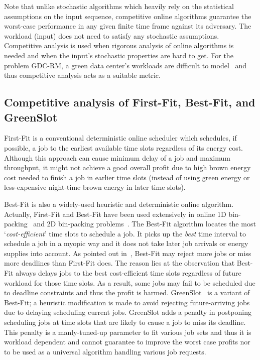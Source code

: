 \documentclass[conference]{IEEEtran}
\begin{document}
Note that unlike stochastic algorithms which heavily rely on the statistical assumptions on the input sequence, competitive online algorithms guarantee the worst-case performance in any given finite time frame against its adversary. The workload (input) does not need to satisfy any stochastic assumptions. Competitive analysis is used when rigorous analysis of online algorithms is needed and when the input's stochastic properties are hard to get. For the problem GDC-RM, a green data center's workloads are difficult to model~\cite{MeisnerW10} and thus competitive analysis acts as a suitable metric.



\subsection{Competitive analysis of First-Fit, Best-Fit, and GreenSlot}

First-Fit is a conventional deterministic online scheduler which schedules, if possible, a job to the earliest available time slots regardless of its energy cost. Although this approach can cause minimum delay of a job and maximum throughput, it might not achieve a good overall profit due to high brown energy cost needed to finish a job in earlier time slots (instead of using green energy or less-expensive night-time brown energy in later time slots).

Best-Fit is also a widely-used heuristic and deterministic online algorithm. Actually, First-Fit and Best-Fit have been used extensively in online 1D bin-packing~\cite{CoffmanCGMV13} and 2D bin-packing problems~\cite{LodiMM02}. The Best-Fit algorithm locates the most `\emph{cost-efficient}' time slots to schedule a job. It picks up the \emph{best} time interval to schedule a job in a myopic way and it does not take later job arrivals or energy supplies into account. As pointed out in~\cite{GoiriL11}, Best-Fit may reject more jobs or miss more deadlines than First-Fit does. The reason lies at the observation that Best-Fit always delays jobs to the best cost-efficient time slots regardless of future workload for those time slots. As a result, some jobs may fail to be scheduled due to deadline constraints and thus the profit is harmed. GreenSlot~\cite{GoiriL11} is a variant of Best-Fit; a heuristic modification is made to avoid rejecting future-arriving jobs due to delaying scheduling current jobs. GreenSlot adds a penalty in postponing scheduling jobs at time slots that are likely to cause a job to miss its deadline. This penalty is a manly-tuned-up parameter to fit various job sets and thus it is workload dependent and cannot guarantee to improve the worst case profits nor to be used as a universal algorithm handling various job requests.
\end{document}

